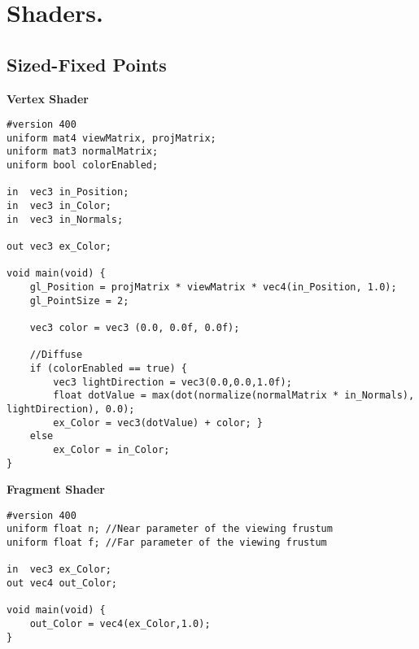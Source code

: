 %
%

\chapter[Shaders]{Shaders.}

\section{Sized-Fixed Points}

\textbf{Vertex Shader}
\begin{lstlisting}[frame=single]
#version 400
uniform mat4 viewMatrix, projMatrix;
uniform mat3 normalMatrix;
uniform bool colorEnabled;

in  vec3 in_Position;
in  vec3 in_Color;
in  vec3 in_Normals;

out vec3 ex_Color;

void main(void) {
	gl_Position = projMatrix * viewMatrix * vec4(in_Position, 1.0);
	gl_PointSize = 2;

	vec3 color = vec3 (0.0, 0.0f, 0.0f);

	//Diffuse
	if (colorEnabled == true) {
		vec3 lightDirection = vec3(0.0,0.0,1.0f);
		float dotValue = max(dot(normalize(normalMatrix * in_Normals), lightDirection), 0.0);
		ex_Color = vec3(dotValue) + color; }
	else
		ex_Color = in_Color;
}
\end{lstlisting}

\textbf{Fragment Shader}
\begin{lstlisting}[frame=single]
#version 400
uniform float n; //Near parameter of the viewing frustum
uniform float f; //Far parameter of the viewing frustum

in  vec3 ex_Color;
out vec4 out_Color;

void main(void) {	
	out_Color = vec4(ex_Color,1.0);
}
\end{lstlisting}
\vfill

